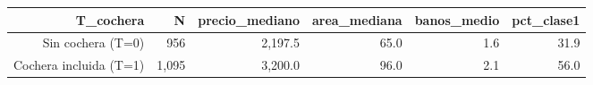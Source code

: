 \begin{tabular}{rrrrrr}
\toprule
T\_cochera & N & precio\_mediano & area\_mediana & banos\_medio & pct\_clase1 \\
\midrule
Sin cochera (T=0) & 956 & 2,197.5 & 65.0 & 1.6 & 31.9 \\
Cochera incluida (T=1) & 1,095 & 3,200.0 & 96.0 & 2.1 & 56.0 \\
\bottomrule
\end{tabular}